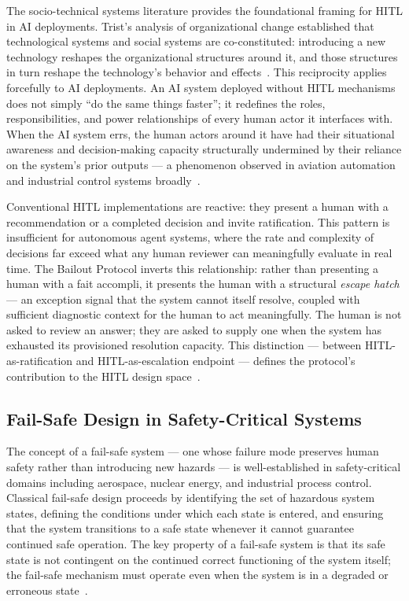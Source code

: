 The socio-technical systems literature provides the foundational framing for HITL in AI deployments. Trist's analysis of organizational change established that technological systems and social systems are co-constituted: introducing a new technology reshapes the organizational structures around it, and those structures in turn reshape the technology's behavior and effects~\cite{tristr81}. This reciprocity applies forcefully to AI deployments. An AI system deployed without HITL mechanisms does not simply ``do the same things faster''; it redefines the roles, responsibilities, and power relationships of every human actor it interfaces with. When the AI system errs, the human actors around it have had their situational awareness and decision-making capacity structurally undermined by their reliance on the system's prior outputs — a phenomenon observed in aviation automation and industrial control systems broadly~\cite{tristr81,bansal2019}.

Conventional HITL implementations are reactive: they present a human with a recommendation or a completed decision and invite ratification. This pattern is insufficient for autonomous agent systems, where the rate and complexity of decisions far exceed what any human reviewer can meaningfully evaluate in real time. The Bailout Protocol inverts this relationship: rather than presenting a human with a fait accompli, it presents the human with a structural \emph{escape hatch} — an exception signal that the system cannot itself resolve, coupled with sufficient diagnostic context for the human to act meaningfully. The human is not asked to review an answer; they are asked to supply one when the system has exhausted its provisioned resolution capacity. This distinction — between HITL-as-ratification and HITL-as-escalation endpoint — defines the protocol's contribution to the HITL design space~\cite{tristr81,bansal2019}.

\subsection{Fail-Safe Design in Safety-Critical Systems}
\label{sec:failsafe}

The concept of a fail-safe system — one whose failure mode preserves human safety rather than introducing new hazards — is well-established in safety-critical domains including aerospace, nuclear energy, and industrial process control. Classical fail-safe design proceeds by identifying the set of hazardous system states, defining the conditions under which each state is entered, and ensuring that the system transitions to a safe state whenever it cannot guarantee continued safe operation. The key property of a fail-safe system is that its safe state is not contingent on the continued correct functioning of the system itself; the fail-safe mechanism must operate even when the system is in a degraded or erroneous state~\cite{dijkstra1982,wiener1948}.

